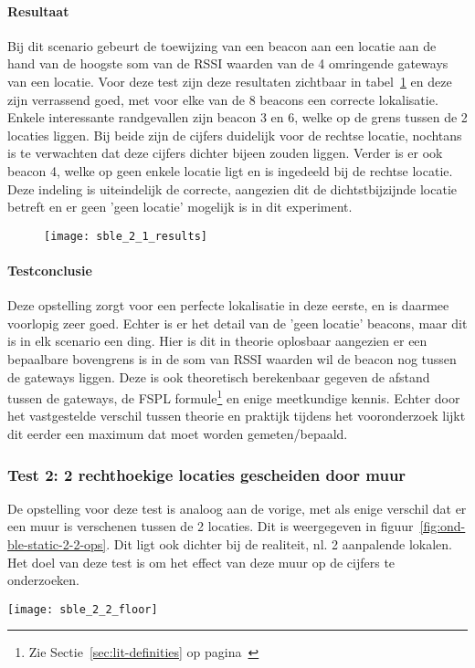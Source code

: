 \paragraph{Resultaat}
Bij dit scenario gebeurt de toewijzing van een beacon aan een locatie aan de hand van de hoogste som van de RSSI waarden van de 4 omringende gateways van een locatie. Voor deze test zijn deze resultaten zichtbaar in tabel~\ref{fig:ond-ble-static-2-1-res} en deze zijn verrassend goed, met voor elke van de 8 beacons een correcte lokalisatie. Enkele interessante randgevallen zijn beacon 3 en 6, welke op de grens tussen de 2 locaties liggen. Bij beide zijn de cijfers duidelijk voor de rechtse locatie, nochtans is te verwachten dat deze cijfers dichter bijeen zouden liggen. Verder is er ook beacon 4, welke op geen enkele locatie ligt en is ingedeeld bij de rechtse locatie. Deze indeling is uiteindelijk de correcte, aangezien dit de dichtstbijzijnde locatie betreft en er geen 'geen locatie' mogelijk is in dit experiment. 
\begin{figure}[h]
	\texttt{[image: sble\_2\_1\_results]}
	\label{fig:ond-ble-static-2-1-res}
\end{figure}

\paragraph{Testconclusie}
Deze opstelling zorgt voor een perfecte lokalisatie in deze eerste, en is daarmee voorlopig zeer goed. Echter is er het detail van de 'geen locatie' beacons, maar dit is in elk scenario een ding. Hier is dit in theorie oplosbaar aangezien er een bepaalbare bovengrens is in de som van RSSI waarden wil de beacon nog tussen de gateways liggen. Deze is ook theoretisch berekenbaar gegeven de afstand tussen de gateways, de FSPL formule\footnote{Zie Sectie~\ref{sec:lit-definities} op pagina~\pageref{sec:lit-definities}} en enige meetkundige kennis. Echter door het vastgestelde verschil tussen theorie en praktijk tijdens het vooronderzoek lijkt dit eerder een maximum dat moet worden gemeten/bepaald.

\subsubsection{Test 2: 2 rechthoekige locaties gescheiden door muur}
\label{sec:ond-ble-2-2}
\begin{minipage}{0.55\textwidth}
De opstelling voor deze test is analoog aan de vorige, met als enige verschil dat er een muur is verschenen tussen de 2 locaties. Dit is weergegeven in figuur~\ref{fig:ond-ble-static-2-2-ops}. Dit ligt ook dichter bij de realiteit, nl. 2 aanpalende lokalen. Het doel van deze test is om het effect van deze muur op de cijfers te onderzoeken.
\end{minipage}
\hfill
\begin{minipage}{0.42\textwidth}
	\texttt{[image: sble\_2\_2\_floor]}
	\label{fig:ond-ble-static-2-2-ops}
\end{minipage}

